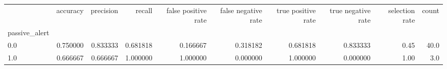 \begin{tabular}{lrrrrrrrrr}
\toprule
{} &  accuracy &  precision &    recall &  false positive rate &  false negative rate &  true positive rate &  true negative rate &  selection rate &  count \\
passive\_alert &           &            &           &                      &                      &                     &                     &                 &        \\
\midrule
0.0           &  0.750000 &   0.833333 &  0.681818 &             0.166667 &             0.318182 &            0.681818 &            0.833333 &            0.45 &   40.0 \\
1.0           &  0.666667 &   0.666667 &  1.000000 &             1.000000 &             0.000000 &            1.000000 &            0.000000 &            1.00 &    3.0 \\
\bottomrule
\end{tabular}

